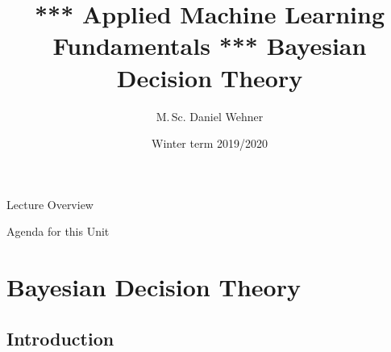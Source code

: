 


\title[Decision Theory]{*** Applied Machine Learning Fundamentals *** Bayesian Decision Theory}
\author{M.\,Sc. Daniel Wehner}
\date{Winter term 2019/2020}




\maketitlepage


\begin{frame}{Lecture Overview}{}
\end{frame}


\begin{frame}{Agenda for this Unit}
	\begin{multicols}{2}
		\tableofcontents
	\end{multicols}
\end{frame}


\section{Bayesian Decision Theory}

\subsection{Introduction}

